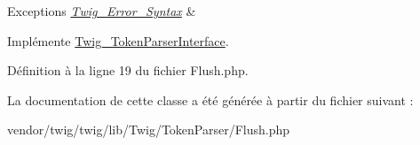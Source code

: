 \begin{DoxyExceptions}{Exceptions}
{\em \hyperlink{class_twig___error___syntax}{Twig\+\_\+\+Error\+\_\+\+Syntax}} & \\
\hline
\end{DoxyExceptions}


Implémente \hyperlink{interface_twig___token_parser_interface_a5dfa2e269321584fb74e8b43dabe0efd}{Twig\+\_\+\+Token\+Parser\+Interface}.



Définition à la ligne 19 du fichier Flush.\+php.



La documentation de cette classe a été générée à partir du fichier suivant \+:\begin{DoxyCompactItemize}
\item 
vendor/twig/twig/lib/\+Twig/\+Token\+Parser/Flush.\+php\end{DoxyCompactItemize}
